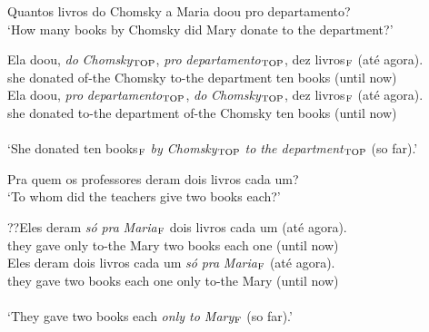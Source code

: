 \documentclass[output=paper]{langscibook}
\begin{document}
\begin{exe}
\ex \label{lacerda21}
\begin{xlist}
 \label{lacerda21A}
Quantos livros do Chomsky a Maria doou pro departamento?\\
‘How many books by Chomsky did Mary donate to the department?’

 \label{lacerda21B1}
\gll Ela 	doou, 	\emph{do} 	\emph{Chomsky}$_{\textnormal{TOP}}$, 	\emph{pro} 	\emph{departamento}$_{\textnormal{TOP}}$,	dez 	livros$_{\textnormal{F}}$ 	(até 	agora).\\
she 	donated	of-the	Chomsky	to-the 	department	ten 	books	(until	now)\\

 \label{lacerda21B2}
\gll Ela 	doou, 	\emph{pro} 	\emph{departamento}$_{\textnormal{TOP}}$,	\emph{do} 	\emph{Chomsky}$_{\textnormal{TOP}}$, 	dez 	livros$_{\textnormal{F}}$	(até 	agora).\\
she 	donated	to-the 	department 	of-the	Chomsky 	ten 	books	(until	now)\\\\
‘She donated ten books$_{\textnormal{F}}$ \emph{by Chomsky$_{\textnormal{TOP}}$} \emph{to the department$_{\textnormal{TOP}}$} (so far).’\\


\end{xlist}

\ex \label{lacerda22}
\begin{xlist}
 \label{lacerda22A}
Pra quem os professores deram dois livros cada um?\\
‘To whom did the teachers give two books each?’

 \label{lacerda22B1}
\gll ??Eles 	deram 	\emph{só} 	\emph{pra} 	\emph{Maria$_{\textnormal{F}}$} 	dois 	livros 	cada 	um 	(até 	agora).\\
they 	gave 	only 	to-the 	Mary 	two 	books 	each 	one (until 	now)\\

 \label{lacerda22B2}
\gll Eles 	deram 	dois 	livros 	cada 	um 	\emph{só} 	\emph{pra} 	\emph{Maria}$_{\textnormal{F}}$ 	(até 	agora).\\
they 	gave 	two 	books 	each 	one 	only 	to-the 	Mary 	(until 	now)\\\\
‘They gave two books each \emph{only to Mary$_{\textnormal{F}}$} (so far).’	\\

\end{xlist}


\end{exe}
\end{document}
